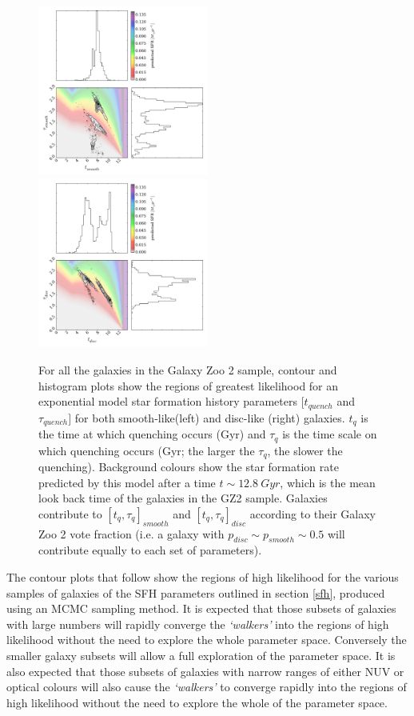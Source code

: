 \documentclass{mn2e}
\begin{document}
\begin{figure}
\includegraphics[width=0.4975\textwidth]{all_smooth.pdf}
\includegraphics[width=0.4975\textwidth]{all_disc.pdf}
\caption[8pt]{For all the galaxies in the Galaxy Zoo 2 sample, contour and histogram plots show the regions of greatest likelihood for an exponential model star formation history parameters $[t_{quench}$ and $\tau_{quench}]$ for both smooth-like(left) and disc-like (right) galaxies. $t_{q}$ is the time at which quenching occurs (Gyr) and $\tau_{q}$ is the time scale on which quenching occurs (Gyr; the larger the $\tau_{q}$, the slower the quenching). Background colours show the star formation rate predicted by this model after a time $t \sim 12.8~Gyr$, which is the mean look back time of the galaxies in the GZ2 sample. Galaxies contribute  to $[t_{q}, \tau_{q}]_{smooth}$ and $[t_{q}, \tau_{q}]_{disc}$ according to their Galaxy Zoo 2 vote fraction (i.e. a galaxy with $p_{disc} \sim p_{smooth} \sim 0.5$ will contribute equally to each set of parameters).}
\label{all}
\end{figure}


The contour plots that follow show the regions of high likelihood for the various samples of galaxies of the SFH parameters outlined in section \ref{sfh}, produced using an MCMC sampling method. It is expected that those subsets of galaxies with large numbers will rapidly converge the \emph{`walkers'} into the regions of high likelihood without the need to explore the whole parameter space. Conversely the smaller galaxy subsets will allow a full exploration of the parameter space. It is also expected that those subsets of galaxies with narrow ranges of either NUV or optical colours will also cause the \emph{`walkers'} to converge rapidly into the regions of high likelihood without the need to explore the whole of the parameter space.
\end{document}
